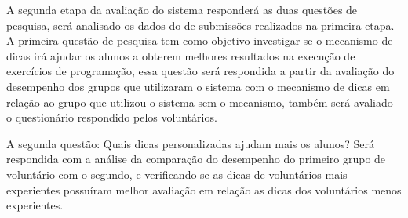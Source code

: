 A segunda etapa da avaliação do sistema responderá as duas questões de pesquisa, será analisado os dados do  de submissões realizados na primeira etapa. A primeira questão de pesquisa tem como objetivo investigar se o mecanismo de dicas irá ajudar os alunos a obterem melhores resultados na execução de exercícios de programação, essa questão será respondida a partir da avaliação do desempenho dos grupos que utilizaram o sistema com o mecanismo de dicas em relação ao grupo que utilizou o sistema sem o mecanismo, também será avaliado o questionário respondido pelos voluntários.   

A segunda questão: Quais dicas personalizadas ajudam mais os alunos? Será respondida com a análise da comparação do desempenho do primeiro grupo de voluntário com o segundo, e verificando se as dicas de voluntários mais experientes possuíram melhor avaliação em relação as dicas dos voluntários menos experientes.
